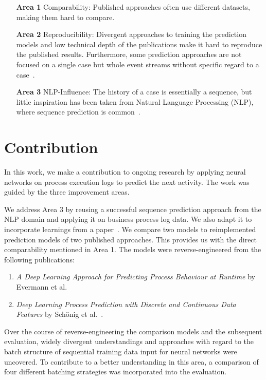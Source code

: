 \begin{enumerate}
    \item[\textbf{Area 1}] Comparability: Published approaches often use different datasets, making them hard to compare.
    \item[\textbf{Area 2}] Reproducibility: Divergent approaches to training the prediction models and low technical depth of the publications make it hard to reproduce the published results. Furthermore, some prediction approaches are not focused on a single case but whole event streams without specific regard to a case~\cite{evermann2016, schoenig2018}.
    \item[\textbf{Area 3}] NLP-Influence: The history of a case is essentially a sequence, but little inspiration has been taken from Natural Language Processing (NLP), where sequence prediction is common~\cite{shibata2016bipartite}.
\end{enumerate}

\section{Contribution}\label{sec:intro:contribution}
In this work, we make a contribution to ongoing research by applying neural networks on process execution logs to predict the next activity. The work was guided by the three improvement areas.

We address Area 3 by reusing a successful sequence prediction approach from the NLP domain and applying it on business process log data. We also adapt it to incorporate learnings from a paper~\cite{klinkmuller2018reliablemonitoring}. We compare two models to reimplemented prediction models of two published approaches. This provides us with the direct comparability mentioned in Area 1. The models were reverse-engineered from the following publications:

\begin{enumerate}
    \item\textit{A Deep Learning Approach for Predicting Process Behaviour at Runtime} by Evermann et al.~\cite{evermann2016}
    \item\textit{Deep Learning Process Prediction with Discrete and Continuous Data Features} by Schönig et al.~\cite{schoenig2018}.
\end{enumerate}

Over the course of reverse-engineering the comparison models and the subsequent evaluation, widely divergent understandings and approaches with regard to the batch structure of sequential training data input for neural networks were uncovered. To contribute to a better understanding in this area, a comparison of four different batching strategies was incorporated into the evaluation.

